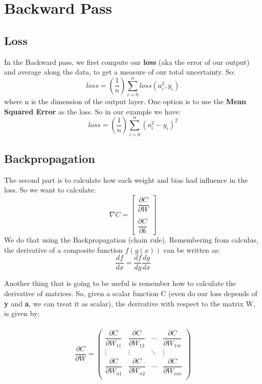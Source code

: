 \documentclass[12pt]{article}
\begin{document}
\section{Backward Pass}
\subsection{Loss}
In the Backward pass, we first compute our \textbf{loss} (aka the error of our output) and average along the data, to get a measure of our total uncertainty. So:
\begin{equation}
    loss = (\dfrac{1}{n}) \sum_{i=0}^{n} loss(a_{i}^{2}, y_{i})
\end{equation}
where n is the dimension of the output layer.
One option is to use the \textbf{Mean Squared Error} as the loss. So in our example we have:
\begin{equation}
    loss = (\dfrac{1}{n}) \sum_{i=0}^{n} (a_{i}^{2} - y_{i})^{2}
\end{equation}

\subsection{Backpropagation}
The second part is to calculate how each weight and bias had influence in the loss. So we want to calculate:
\begin{equation}
\nabla C
=
\begin{bmatrix}
\dfrac{\partial C}{\partial W} \\\\
\dfrac{\partial C}{\partial b} 
\end{bmatrix}
\end{equation}
We do that using the Backpropagation (chain rule). Remembering from calculus, the derivative of a composite function $f(g(x))$ can be written as:
\begin{equation}
    \dfrac{df}{dx} = \dfrac{df}{dg} \dfrac{dg}{dx}
\end{equation}


Another thing that is going to be useful is remember how to calculate the derivative of matrices. So, given a scalar function C (even do our loss depends of \textbf{y} and \textbf{a}, we can treat it as scalar), the derivative with respect to the matrix W, is given by:
\\\\
\begin{equation}
\dfrac{\partial C}{\partial W}
=
\begin{pmatrix}
\dfrac{\partial C}{\partial W_{11}} & \dfrac{\partial C}{\partial W_{12}} & \cdots & \dfrac{\partial C}{\partial W_{1m}} \\
\vdots & \vdots & \ddots & \vdots \\
\dfrac{\partial C}{\partial W_{n1}} & \dfrac{\partial C}{\partial W_{n2}} & \cdots & \dfrac{\partial C}{\partial W_{nm}} \\
\end{pmatrix}
\end{equation}
\end{document}
